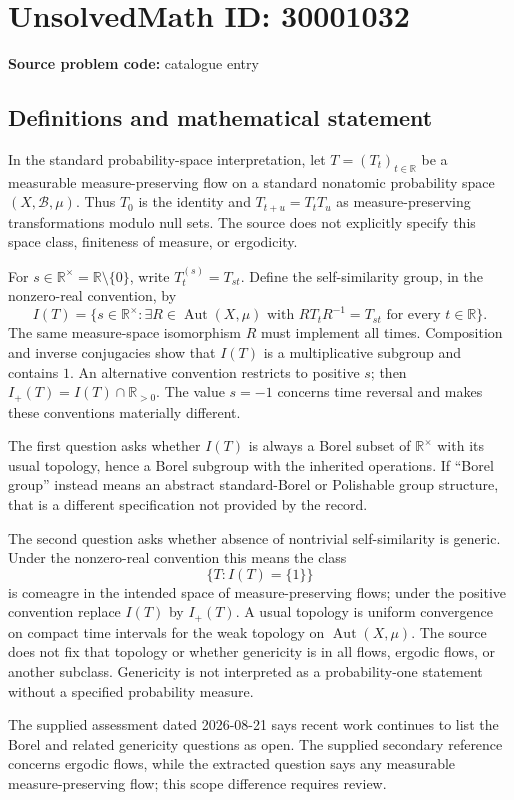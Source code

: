 \documentclass[11pt]{article}
\newcommand{\R}{\mathbb{R}}
\begin{document}
\section*{UnsolvedMath ID: 30001032}
\textbf{Source problem code:} catalogue entry
\subsection{Definitions and mathematical statement}
In the standard probability-space interpretation, let \(T=(T_t)_{t\in\R}\) be a measurable measure-preserving flow on a standard nonatomic probability space \((X,\mathcal B,\mu)\). Thus \(T_0\) is the identity and \(T_{t+u}=T_tT_u\) as measure-preserving transformations modulo null sets. The source does not explicitly specify this space class, finiteness of measure, or ergodicity.

For \(s\in\R^\times=\R\setminus\{0\}\), write \(T^{(s)}_t=T_{st}\). Define the self-similarity group, in the nonzero-real convention, by
\[
 I(T)=\{s\in\R^\times:\exists R\in\operatorname{Aut}(X,\mu)
 \text{ with }RT_tR^{-1}=T_{st}\text{ for every }t\in\R\}.
\]
The same measure-space isomorphism \(R\) must implement all times. Composition and inverse conjugacies show that \(I(T)\) is a multiplicative subgroup and contains \(1\). An alternative convention restricts to positive \(s\); then \(I_+(T)=I(T)\cap\R_{>0}\). The value \(s=-1\) concerns time reversal and makes these conventions materially different.

The first question asks whether \(I(T)\) is always a Borel subset of \(\R^\times\) with its usual topology, hence a Borel subgroup with the inherited operations. If ``Borel group'' instead means an abstract standard-Borel or Polishable group structure, that is a different specification not provided by the record.

The second question asks whether absence of nontrivial self-similarity is generic. Under the nonzero-real convention this means the class
\[
 \{T:I(T)=\{1\}\}
\]
is comeagre in the intended space of measure-preserving flows; under the positive convention replace \(I(T)\) by \(I_+(T)\). A usual topology is uniform convergence on compact time intervals for the weak topology on \(\operatorname{Aut}(X,\mu)\). The source does not fix that topology or whether genericity is in all flows, ergodic flows, or another subclass. Genericity is not interpreted as a probability-one statement without a specified probability measure.

The supplied assessment dated 2026-08-21 says recent work continues to list the Borel and related genericity questions as open. The supplied secondary reference concerns ergodic flows, while the extracted question says any measurable measure-preserving flow; this scope difference requires review.
\end{document}
